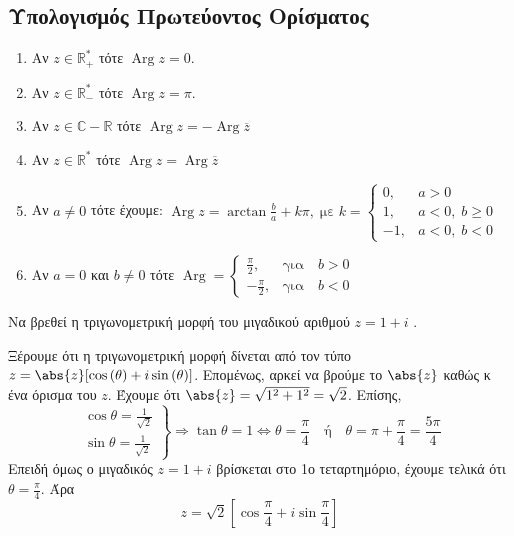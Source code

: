 \documentclass[a4paper,table]{report}
\DeclareMathOperator{\Arg}{Arg}
\begin{document}
  \subsection*{Υπολογισμός Πρωτεύοντος Ορίσματος}

  \begin{mybox2}
  \item {}
    \begin{enumerate}
      \item Αν $ z \in \mathbb{R}_{+}^{*} $ τότε $ \Arg z = 0 $.
      \item Αν $ z \in \mathbb{R}_{-}^{*} $ τότε $ \Arg z = \pi $.
      \item Αν $ z \in \mathbb{C}- \mathbb{R} $ τότε $ \Arg z = - \Arg \overline{z} $
      \item Αν $ z \in \mathbb{R}^{*} $ τότε $ \Arg z = \Arg \overline{z} $
      \item Αν $a\neq 0$ τότε έχουμε:
        $
        \Arg z=\arctan\frac{b}{a}+k\pi, \; \text{με}\; k=
        \begin{cases}
          0, & a>0 \\
          1, & a<0, \; b \geq 0 \\
          -1, & a<0, \; b<0
        \end{cases}
        $
      \item Αν $a=0$ και $b\neq 0$ τότε
        $ 
        \Arg= 
        \begin{cases}
          \frac{\pi}{2},  &\text{για}\quad   b>0 \\[10pt]
          -\frac{\pi}{2}, &\text{για}\quad   b<0
        \end{cases}
        $
    \end{enumerate}
  \end{mybox2}

  \begin{example}
    Να βρεθεί η τριγωνομετρική μορφή του μιγαδικού αριθμού $ z=1+i $ . 
  \end{example}
  \begin{solution}
    Ξέρουμε ότι η τριγωνομετρική μορφή δίνεται από τον τύπο 
    $ z = \abs{z} [\cos{(\theta)} + i \sin{(\theta)}] $. 
    Επομένως, αρκεί να βρούμε το $ \abs{z} $ καθώς κ ένα όρισμα 
    του $z$. Έχουμε ότι $ \abs{z} = \sqrt{1^{2}+1^{2}} = \sqrt{2} $. Επίσης,
    \[
      \left.
        \begin{matrix}
          \cos{\theta} = \frac{1}{\sqrt{2}} \\[10pt]
          \sin{\theta} = \frac{1}{\sqrt{2}} 
        \end{matrix} 
      \right\} 
      \Rightarrow 
      \tan{\theta} = 1 \Leftrightarrow \theta = \frac{\pi}{4} \quad \text{ή} \quad 
      \theta = \pi + \frac{\pi}{4} = \frac{5 \pi}{4}
    \] 
    Επειδή όμως ο μιγαδικός $ z=1+i $ βρίσκεται στο 1ο τεταρτημόριο, έχουμε 
    τελικά ότι $ \theta = \frac{\pi}{4} $. Άρα 
    \[
      \boxed{z= \sqrt{2} \left[ \cos{\frac{\pi}{4}} + i \sin{\frac{\pi}{4}}\right]} 
    \]
  \end{solution}
\end{document}
